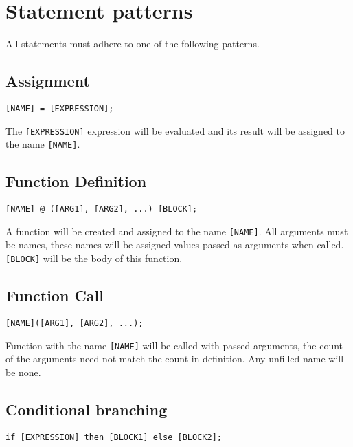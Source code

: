 \documentclass[a4paper,11pt,openany]{article}
\begin{document}
\begin{lstlisting}[frame=none]

\end{lstlisting}

\section{Statement patterns}

All statements must adhere to one of the following patterns.

\subsection{Assignment}
\begin{lstlisting}[frame=none]
[NAME] = [EXPRESSION];
\end{lstlisting}

The \texttt{[EXPRESSION]} expression will be evaluated and its result will be assigned to the name \texttt{[NAME]}.

\subsection{Function Definition}
\begin{lstlisting}[frame=none]
[NAME] @ ([ARG1], [ARG2], ...) [BLOCK];
\end{lstlisting}
A function will be created and assigned to the name \texttt{[NAME]}. All arguments must be names, these names will be assigned values passed as arguments when called. \texttt{[BLOCK]} will be the body of this function.

\subsection{Function Call}
\begin{lstlisting}[frame=none]
[NAME]([ARG1], [ARG2], ...);
\end{lstlisting}
Function with the name \texttt{[NAME]} will be called with passed arguments, the count of the arguments need not match the count in definition. Any unfilled name will be none.

\subsection{Conditional branching}
\begin{lstlisting}[frame=none]
if [EXPRESSION] then [BLOCK1] else [BLOCK2];
\end{lstlisting}
\end{document}
